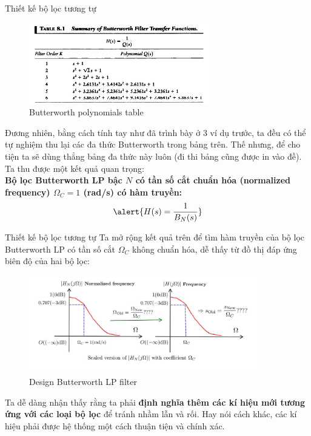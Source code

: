 \documentclass[8pt]{beamer}
\begin{document}
\begin{frame}{Thiết kế bộ lọc tương tự}
\begin{figure}[h]
			\includegraphics[width=0.7\textwidth]{phpe46ibx.png}
		\caption{Butterworth polynomials table}			\label{fig:re2}
		\end{figure}
Đương nhiên, bằng cách tính tay như đã trình bày ở 3 ví dụ trước, ta đều có thể tự nghiệm thu lại các đa thức Butterworth trong bảng trên. Thế nhưng, để cho tiện ta sẽ dùng thẳng bảng đa thức này luôn (đi thi bảng cũng được in vào đề).
\\ Ta thu được một kết quả quan trọng:  \\\textbf{\alert{Bộ lọc Butterworth LP bậc $N$ có tần số cắt chuẩn hóa (normalized frequency) $\Omega_{C}=1$ (rad/s) có hàm truyền:}} $$\alert{H(s)=\frac{1}{B_{N}(s)}}$$
\end{frame}
\begin{frame}{Thiết kế bộ lọc tương tự}
Ta mở rộng kết quả trên để tìm hàm truyền của bộ lọc Butterworth LP có \alert{tần số cắt $\Omega_{C}$ không chuẩn hóa}, dễ thấy từ đồ thị đáp ứng biên độ của hai bộ lọc:
\begin{figure}[h]
	\includegraphics[width=0.9\textwidth]{13.jpg}
	\caption{Design Butterworth LP filter}			\label{fig:re2}
		\end{figure}
		Ta dễ dàng nhận thấy rằng ta phải \textbf{định nghĩa thêm các kí hiệu mới tương ứng với các loại bộ lọc} để tránh nhầm lẫn và rối. Hay nói cách khác, các kí hiệu phải được \alert{hệ thống} một cách thuận tiện và chính xác.

\end{frame}
\end{document}
